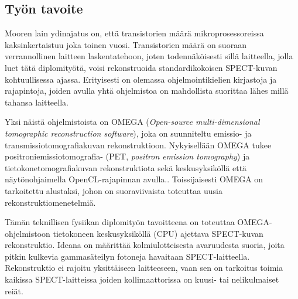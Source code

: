 \subsection{Työn tavoite}
Mooren lain ydinajatus on, että transistorien määrä mikroprosessoreissa kaksinkertaistuu joka toinen vuosi. Transistorien määrä on suoraan verrannollinen laitteen laskentatehoon, joten todennäköisesti sillä laitteella, jolla luet tätä diplomityötä, voisi rekonstruoida standardikokoisen SPECT-kuvan kohtuullisessa ajassa. Erityisesti on olemassa ohjelmointikielien kirjastoja ja rajapintoja, joiden avulla yhtä ohjelmistoa on mahdollista suorittaa lähes millä tahansa laitteella.

Yksi näistä ohjelmistoista on OMEGA (\textit{Open-source multi-dimensional tomographic reconstruction software}), joka on suunniteltu emissio- ja transmissiotomografiakuvan rekonstruktioon. Nykyisellään OMEGA tukee positroniemissiotomografia- (PET, \textit{positron emission tomography}) ja tietokonetomografiakuvan rekonstruktiota sekä keskusyksiköllä että näytönohjaimella OpenCL-rajapinnan avulla.\cite{wettenhovi_omegaopen-source_2021}. Toissijaisesti OMEGA on tarkoitettu alustaksi, johon on suoraviivaista toteuttaa uusia rekonstruktiomenetelmiä. 

Tämän teknillisen fysiikan diplomityön tavoitteena on toteuttaa OMEGA-ohjelmistoon tietokoneen keskusyksiköllä (CPU) ajettava SPECT-kuvan rekonstruktio. Ideana on määrittää kolmiulotteisesta avaruudesta suoria, joita pitkin kulkevia gammasäteilyn fotoneja havaitaan SPECT-laitteella. Rekonstruktio ei rajoitu yksittäiseen laitteeseen, vaan sen on tarkoitus toimia kaikissa SPECT-laitteissa joiden kollimaattorissa on kuusi- tai nelikulmaiset reiät.